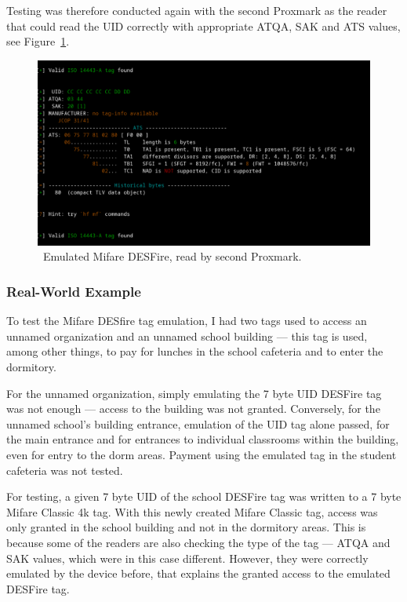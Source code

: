 Testing was therefore conducted again with the second Proxmark as the reader that could read the UID correctly with appropriate ATQA, SAK and ATS values, see Figure~\ref{fig:desfireemulation}.

\begin{figure}[ht]
  \centering
  \includegraphics[width=13cm]{text/testing/des_emulation.png}
  \caption{~Emulated Mifare DESFire, read by second Proxmark.}
  \label{fig:desfireemulation}
\end{figure}

\subsubsection{Real-World Example}
To test the Mifare DESfire tag emulation, I had two tags used to access an unnamed organization and an unnamed school building --- this tag is used, among other things, to pay for lunches in the school cafeteria and to enter the dormitory. 

For the unnamed organization, simply emulating the 7 byte UID DESFire tag was not enough --- access to the building was not granted. Conversely, for the unnamed school's building entrance, emulation of the UID tag alone passed, for the main entrance and for entrances to individual classrooms within the building, even for entry to the dorm areas. Payment using the emulated tag in the student cafeteria was not tested.

For testing, a given 7 byte UID of the school DESFire tag was written to a 7 byte Mifare Classic 4k tag. With this newly created Mifare Classic tag, access was only granted in the school building and not in the dormitory areas. This is because some of the readers are also checking the type of the tag --- ATQA and SAK values, which were in this case different. However, they were correctly emulated by the device before, that explains the granted access to the emulated DESFire tag.

